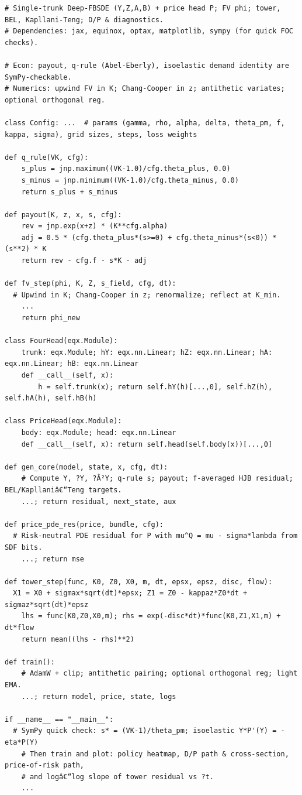 \documentclass[11pt,letterpaper,oneside]{article}
\numberwithin{equation}{section}
\newcommand{\1}{\mathbf{1}}
\begin{document}
\begin{tcolorbox}[sympycheckstyle,title={Compact scaffold (illustrative; paste into a Python file)}]
\begin{Verbatim}[fontsize=\small]
# Single-trunk Deep-FBSDE (Y,Z,A,B) + price head P; FV phi; tower, BEL, Kapllani-Teng; D/P & diagnostics.
# Dependencies: jax, equinox, optax, matplotlib, sympy (for quick FOC checks).

# Econ: payout, q-rule (Abel-Eberly), isoelastic demand identity are SymPy-checkable.
# Numerics: upwind FV in K; Chang-Cooper in z; antithetic variates; optional orthogonal reg.

class Config: ...  # params (gamma, rho, alpha, delta, theta_pm, f, kappa, sigma), grid sizes, steps, loss weights

def q_rule(VK, cfg):
    s_plus = jnp.maximum((VK-1.0)/cfg.theta_plus, 0.0)
    s_minus = jnp.minimum((VK-1.0)/cfg.theta_minus, 0.0)
    return s_plus + s_minus

def payout(K, z, x, s, cfg):
    rev = jnp.exp(x+z) * (K**cfg.alpha)
    adj = 0.5 * (cfg.theta_plus*(s>=0) + cfg.theta_minus*(s<0)) * (s**2) * K
    return rev - cfg.f - s*K - adj

def fv_step(phi, K, Z, s_field, cfg, dt):
  # Upwind in K; Chang-Cooper in z; renormalize; reflect at K_min.
    ...
    return phi_new

class FourHead(eqx.Module):
    trunk: eqx.Module; hY: eqx.nn.Linear; hZ: eqx.nn.Linear; hA: eqx.nn.Linear; hB: eqx.nn.Linear
    def __call__(self, x):
        h = self.trunk(x); return self.hY(h)[...,0], self.hZ(h), self.hA(h), self.hB(h)

class PriceHead(eqx.Module):
    body: eqx.Module; head: eqx.nn.Linear
    def __call__(self, x): return self.head(self.body(x))[...,0]

def gen_core(model, state, x, cfg, dt):
    # Compute Y, ?Y, ?Â²Y; q-rule s; payout; f-averaged HJB residual; BEL/Kapllaniâ€“Teng targets.
    ...; return residual, next_state, aux

def price_pde_res(price, bundle, cfg):
  # Risk-neutral PDE residual for P with mu^Q = mu - sigma*lambda from SDF bits.
    ...; return mse

def tower_step(func, K0, Z0, X0, m, dt, epsx, epsz, disc, flow):
  X1 = X0 + sigmax*sqrt(dt)*epsx; Z1 = Z0 - kappaz*Z0*dt + sigmaz*sqrt(dt)*epsz
    lhs = func(K0,Z0,X0,m); rhs = exp(-disc*dt)*func(K0,Z1,X1,m) + dt*flow
    return mean((lhs - rhs)**2)

def train():
    # AdamW + clip; antithetic pairing; optional orthogonal reg; light EMA.
    ...; return model, price, state, logs

if __name__ == "__main__":
  # SymPy quick check: s* = (VK-1)/theta_pm; isoelastic Y*P'(Y) = -eta*P(Y)
    # Then train and plot: policy heatmap, D/P path & cross-section, price-of-risk path,
    # and logâ€“log slope of tower residual vs ?t.
    ...
\end{Verbatim}
\end{tcolorbox}
\end{document}
